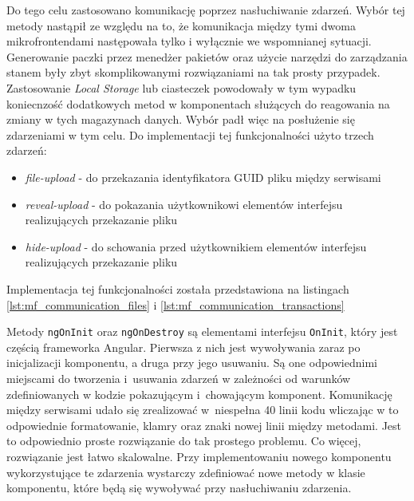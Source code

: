 \documentclass{SGGW-thesis}
\begin{document}
  Do tego celu zastosowano komunikację poprzez nasłuchiwanie zdarzeń. Wybór tej metody nastąpił ze względu na to, że komunikacja między tymi dwoma mikrofrontendami następowała tylko i wyłącznie we wspomnianej sytuacji. Generowanie paczki przez menedżer pakietów oraz użycie narzędzi do zarządzania stanem były zbyt skomplikowanymi rozwiązaniami na tak prosty przypadek. Zastosowanie \textit{Local Storage} lub ciasteczek powodowały w tym wypadku koniecnzość dodatkowych metod w komponentach służących do reagowania na zmiany w tych magazynach danych. Wybór padł więc na posłużenie się zdarzeniami w tym celu. Do implementacji tej funkcjonalności użyto trzech zdarzeń:

  \begin{itemize}
    \item \textit{file-upload} - do przekazania identyfikatora GUID pliku między serwisami
    \item \textit{reveal-upload} - do pokazania użytkownikowi elementów interfejsu realizujących przekazanie pliku
    \item \textit{hide-upload} - do schowania przed użytkownikiem elementów interfejsu realizujących przekazanie pliku
  \end{itemize}

  Implementacja tej funkcjonalności została przedstawiona na listingach \cref{lst:mf_communication_files} i \cref{lst:mf_communication_transactions}

  

  \vfill

  

  Metody \lstinline{ngOnInit} oraz \lstinline{ngOnDestroy} są elementami interfejsu \lstinline{OnInit}, który jest częścią frameworka Angular. Pierwsza z nich jest wywoływania zaraz po inicjalizacji komponentu, a druga przy jego usuwaniu. Są one odpowiednimi miejscami do tworzenia i~usuwania zdarzeń w zależności od warunków zdefiniowanych w kodzie pokazującym i~chowającym komponent. Komunikację między serwisami udało się zrealizować w~niespełna 40 linii kodu wliczając w to odpowiednie formatowanie, klamry oraz znaki nowej linii między metodami. Jest to odpowiednio proste rozwiązanie do tak prostego problemu. Co więcej, rozwiązanie jest łatwo skalowalne. Przy implementowaniu nowego komponentu wykorzystujące te zdarzenia wystarczy zdefiniować nowe metody w klasie komponentu, które będą się wywoływać przy nasłuchiwaniu zdarzenia.
\end{document}
